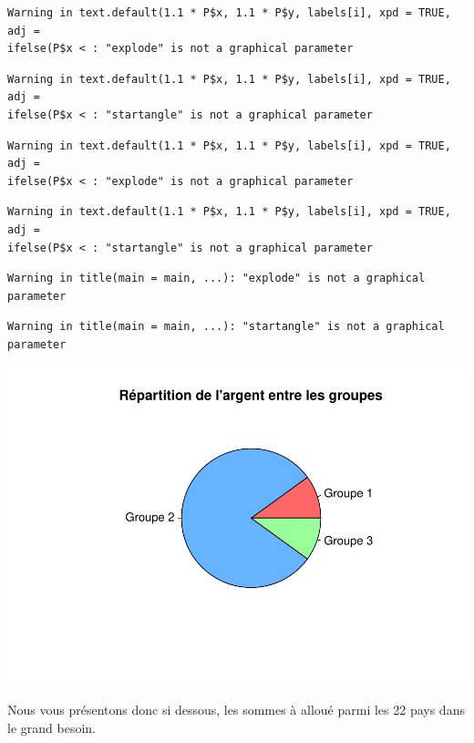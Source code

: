 \documentclass[
]{article}
\begin{document}
\begin{verbatim}
Warning in text.default(1.1 * P$x, 1.1 * P$y, labels[i], xpd = TRUE, adj =
ifelse(P$x < : "explode" is not a graphical parameter
\end{verbatim}

\begin{verbatim}
Warning in text.default(1.1 * P$x, 1.1 * P$y, labels[i], xpd = TRUE, adj =
ifelse(P$x < : "startangle" is not a graphical parameter
\end{verbatim}

\begin{verbatim}
Warning in text.default(1.1 * P$x, 1.1 * P$y, labels[i], xpd = TRUE, adj =
ifelse(P$x < : "explode" is not a graphical parameter
\end{verbatim}

\begin{verbatim}
Warning in text.default(1.1 * P$x, 1.1 * P$y, labels[i], xpd = TRUE, adj =
ifelse(P$x < : "startangle" is not a graphical parameter
\end{verbatim}

\begin{verbatim}
Warning in title(main = main, ...): "explode" is not a graphical parameter
\end{verbatim}

\begin{verbatim}
Warning in title(main = main, ...): "startangle" is not a graphical parameter
\end{verbatim}

\includegraphics{Projet_files/figure-latex/unnamed-chunk-46-1.pdf}

Nous vous présentons donc si dessous, les sommes à alloué parmi les 22
pays dans le grand besoin.
\end{document}
